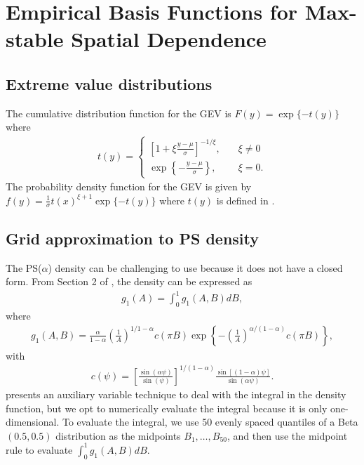 \chapter{Empirical Basis Functions for Max-stable Spatial Dependence}

\section{Extreme value distributions} \label{eba:GEV}
The cumulative distribution function for the GEV is $F(y) = \exp\{-t(y)\}$ where
\begin{align} \label{ebeq:gevt}
  t(y) = \left\{ \begin{array}{ll}
      \left[1 + \xi \displaystyle \frac{y - \mu}{\sigma}\right]^{-1 / \xi}, \quad &\xi \neq 0 \\ [0.5em]
      \exp\left\{- \displaystyle \frac{y - \mu}{\sigma}\right\}, &\xi = 0.
  \end{array}\right.
\end{align}
The probability density function for the GEV is given by $f(y) = \frac{1}{\sigma} t(x)^{\xi + 1} \exp\{-t(y)\}$ where $t(y)$ is defined in .

\section{Grid approximation to PS density} \label{eba:gridapprox}
The PS($\alpha$) density can be challenging to use because it does not have a closed form.
From Section 2 of \citep{Stephenson2009}, the density can be expressed as
\begin{align}
  g_1(A) = \int_0^1 g_1(A, B) dB,
\end{align}
where
\begin{align}
  g_1(A, B) = \frac{\alpha}{1 - \alpha} \left( \frac{1}{A} \right)^{1 / 1 - \alpha} c(\pi B) \exp \left\{ -\left(\frac{1}{A}\right)^{\alpha / (1 - \alpha)} c(\pi B) \right\},
\end{align}
with
\begin{align}
  c(\psi) = \left[\frac{\sin(\alpha \psi)}{\sin(\psi)}\right]^{1 / (1 - \alpha)} \frac{\sin[(1 - \alpha) \psi]}{\sin(\alpha \psi)}.
\end{align}
 presents an auxiliary variable technique to deal with the integral in the density function, but we opt to numerically evaluate the integral because it is only one-dimensional.
To evaluate the integral, we use 50 evenly spaced quantiles of a Beta$(0.5, 0.5)$ distribution as the midpoints $B_1, \ldots, B_{50}$, and then use the midpoint rule to evaluate $\displaystyle \int_0^1 g_1(A, B) dB$.

